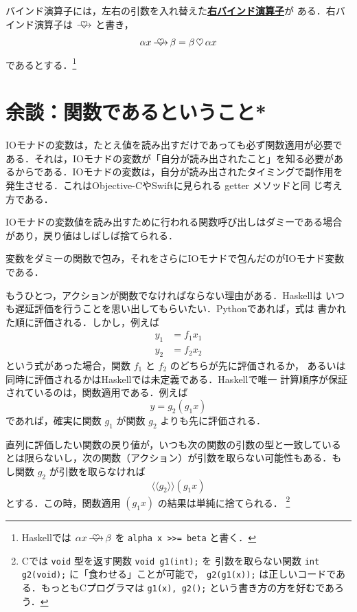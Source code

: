 \documentclass[a5paper,twoside,fleqn]{jsbook}
\newcommand{\Langle}{\langle\!\langle}
\newcommand{\Rangle}{\rangle\!\rangle}
\newcommand{\programminglanguage}[1]{\textsf{#1}}
\newcommand{\clang}{\programminglanguage{C}}
\newcommand{\haskell}{\programminglanguage{Haskell}}
\newcommand{\objectivec}{\programminglanguage{Objective-C}}
\newcommand{\python}{\programminglanguage{Python}}
\newcommand{\swift}{\programminglanguage{Swift}}
\newcommand{\keyword}[1]{{\underline{\textbf{#1}}}}
\newcommand{\code}[1]{\texttt{#1}}
\DeclareMathOperator{\mBind}{\heartsuit}
\DeclareMathOperator{\mBindRight}{\ooalign{$\longrightarrow$\crcr\hss$\mBind$\hss}}
\newcommand{\mFuncWith}[1]{\Langle#1\Rangle}
\begin{document}
バインド演算子には，左右の引数を入れ替えた\keyword{右バインド演算子}が
ある．右バインド演算子は $\mBindRight$ と書き，
\begin{equation}
\alpha x\mBindRight\beta=\beta\mBind\alpha x
\end{equation}
であるとする．\footnote{\haskell では $\alpha x\mBindRight\beta$ を \code{alpha x >>= beta} と書く．}

\section{余談：関数であるということ*}

IOモナドの変数は，たとえ値を読み出すだけであっても必ず関数適用が必要で
ある．それは，IOモナドの変数が「自分が読み出されたこと」を知る必要があ
るからである．IOモナドの変数は，自分が読み出されたタイミングで副作用を
発生させる．これは\objectivec や\swift に見られる getter メソッドと同
じ考え方である．

IOモナドの変数値を読み出すために行われる関数呼び出しはダミーである場合
があり，戻り値はしばしば捨てられる．

変数をダミーの関数で包み，それをさらにIOモナドで包んだのがIOモナド変数
である．

もうひとつ，アクションが関数でなければならない理由がある．\haskell は
いつも遅延評価を行うことを思い出してもらいたい．\python であれば，式は
書かれた順に評価される．しかし，例えば
\begin{align}
y_1&=f_1x_1\\
y_2&=f_2x_2
\end{align}
という式があった場合，関数 $f_1$ と $f_2$ のどちらが先に評価されるか，
あるいは同時に評価されるかは\haskell では未定義である．\haskell で唯一
計算順序が保証されているのは，関数適用である．例えば
\begin{equation}
y=g_2(g_1x)
\end{equation}
であれば，確実に関数 $g_1$ が関数 $g_2$ よりも先に評価される．

直列に評価したい関数の戻り値が，いつも次の関数の引数の型と一致している
とは限らないし，次の関数（アクション）が引数を取らない可能性もある．も
し関数 $g_2$ が引数を取らなければ
\begin{equation}
\mFuncWith{g_2}(g_1x)
\end{equation}
とする．この時，関数適用 $(g_1x)$ の結果は単純に捨てられる．
\footnote{\clang では \code{void} 型を返す関数 \code{void g1(int);} を
引数を取らない関数 \code{int g2(void);} に「食わせる」ことが可能で，
\code{g2(g1(x));} は正しいコードである．もっとも\clang プログラマは
\code{g1(x), g2();} という書き方の方を好むであろう．}
\end{document}
